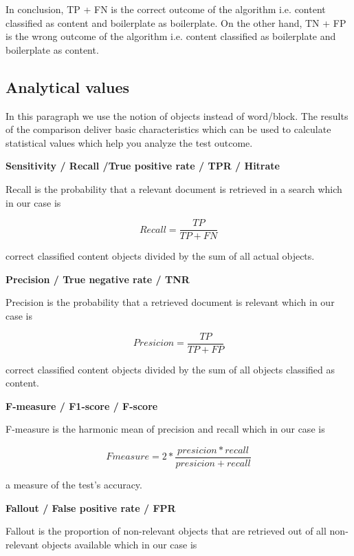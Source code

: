 In conclusion, TP + FN is the correct outcome of the algorithm i.e. content classified as content and boilerplate as boilerplate. On the other hand, TN + FP is the wrong outcome of the algorithm i.e. content classified as boilerplate and boilerplate as content.



\subsection{Analytical values}
\label{subsec:Analytical values}

In this paragraph we use the notion of objects instead of word/block.
The results of the comparison deliver basic characteristics which can be used to calculate statistical values which help you analyze the test outcome.
										
\textbf{ Sensitivity / Recall /True positive rate / TPR / Hitrate }

Recall is the probability that a relevant document is retrieved in a search which in our case is

\begin{equation}
 Recall =\frac{TP}{TP + FN}
\end{equation}

correct classified content objects divided by the sum of all actual objects.

\textbf{Precision / True negative rate / TNR} 


Precision is the probability that a retrieved document is relevant which in our case is

\begin{equation}
 Presicion = \frac{TP}{TP + FP}
\end{equation}

correct classified content objects divided by the sum of all objects classified as content.

\textbf{F-measure / F1-score / F-score} 

F-measure is the harmonic mean of precision and recall which in our case is

\begin{equation}
Fmeasure =  2* \frac{presicion * recall}{presicion + recall}
\end{equation}

a measure of the test's accuracy.



\textbf{Fallout / False positive rate / FPR}

Fallout is the proportion of non-relevant objects that are retrieved out of all non-relevant objects available which in our case is

